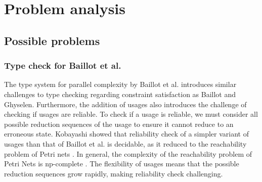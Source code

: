 
\chapter{Problem analysis}

\section{Possible problems}



\subsection*{Type check for Baillot et al.}
The type system for parallel complexity by Baillot et al. \cite{BaillotEtAl2021} introduces similar challenges to type checking regarding constraint satisfaction as Baillot and Ghyselen. Furthermore, the addition of usages also introduces the challenge of checking if usages are reliable. To check if a usage is reliable, we must consider all possible reduction sequences of the usage to ensure it cannot reduce to an erroneous state. Kobayashi showed that reliability check of a simpler variant of usages than that of Baillot et al. is decidable, as it reduced to the reachability problem of Petri nets \cite{KobayashiEtAl2000}. In general, the complexity of the reachability problem of Petri Nets is np-complete \cite{EsparzaAndNielsen}. The flexibility of usages means that the possible reduction sequences grow rapidly, making reliability check challenging.

